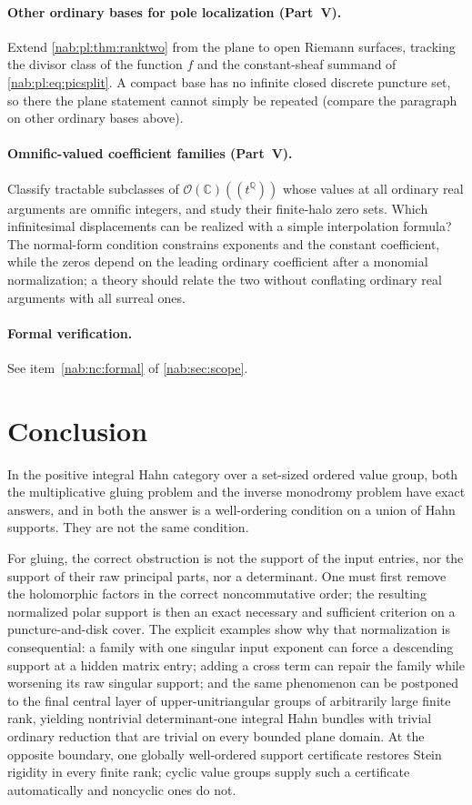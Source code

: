 \documentclass[11pt,letterpaper]{article}
\theoremstyle{definition}
\theoremstyle{remark}
\newcommand{\C}{\mathbb C}
\newcommand{\Q}{\mathbb Q}
\newcommand{\OO}{\mathcal O}
\numberwithin{equation}{section}
\begin{document}
\paragraph{Other ordinary bases for pole localization (Part~V).}
Extend \cref{nab:pl:thm:ranktwo} from the plane to open Riemann surfaces,
tracking the divisor class of the function $f$ and the constant-sheaf summand
of \eqref{nab:pl:eq:picsplit}. A compact base has no infinite closed discrete
puncture set, so there the plane statement cannot simply be repeated (compare
the paragraph on other ordinary bases above).

\paragraph{Omnific-valued coefficient families (Part~V).}
Classify tractable subclasses of $\OO(\C)((t^\Q))$ whose values at all ordinary
real arguments are omnific integers, and study their finite-halo zero sets.
Which infinitesimal displacements can be realized with a simple interpolation
formula? The normal-form condition constrains exponents and the constant
coefficient, while the zeros depend on the leading ordinary coefficient after a
monomial normalization; a theory should relate the two without conflating
ordinary real arguments with all surreal ones.

\paragraph{Formal verification.}
See item~\ref{nab:nc:formal} of \cref{nab:sec:scope}.

\section{Conclusion}\label{nab:sec:conclusion}

In the positive integral Hahn category over a set-sized ordered value group,
both the multiplicative gluing problem and the inverse monodromy problem have
exact answers, and in both the answer is a well-ordering condition on a union
of Hahn supports. They are not the same condition.

For gluing, the correct obstruction is not the support of the input entries,
nor the support of their raw principal parts, nor a determinant. One must first
remove the holomorphic factors in the correct noncommutative order; the
resulting normalized polar support is then an exact necessary and sufficient
criterion on a puncture-and-disk cover. The explicit examples show why that
normalization is consequential: a family with one singular input exponent can
force a descending support at a hidden matrix entry; adding a cross term can
repair the family while worsening its raw singular support; and the same
phenomenon can be postponed to the final central layer of upper-unitriangular
groups of arbitrarily large finite rank, yielding nontrivial determinant-one
integral Hahn bundles with trivial ordinary reduction that are trivial on every
bounded plane domain. At the opposite boundary, one globally well-ordered
support certificate restores Stein rigidity in every finite rank; cyclic value
groups supply such a certificate automatically and noncyclic ones do not.
\end{document}
